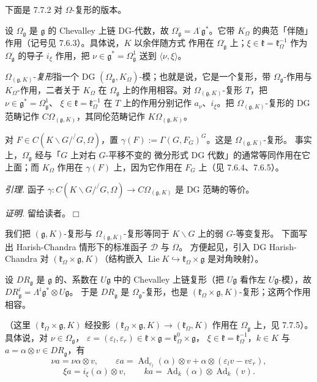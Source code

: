  下面是 7.7.2 对 $\Omega$-复形的版本。

设 $\Omega_{\mathfrak{g}}$ 是 $\mathfrak{g}$ 的 Chevalley 上链 DG-代数，故
$\Omega_{\mathfrak{g}}^{\cdot}=\Lambda^{\cdot}\mathfrak{g}^*$。它带
$K_\Omega$ 的典范「伴随」作用（记号见 7.6.3）。具体说，$K$ 以余伴随方式
作用在 $\Omega_{\mathfrak{g}}^{\cdot}$ 上；$\xi\in\mathfrak{k}
=\mathfrak{k}_\Omega^{-1}$ 作为 $\Omega_{\mathfrak{g}}^{\cdot}$ 的导子
$i_\xi$ 作用，把 $\nu\in\mathfrak{g}^*=\Omega_{\mathfrak{g}}^1$ 送到
$\langle\nu,\xi\rangle$。

$\Omega_{(\mathfrak{g},K)}$-\emph{复形}指一个 DG
$(\Omega_{\mathfrak{g}},K_\Omega)$-模；也就是说，它是一个复形，带
$\Omega_{\mathfrak{g}}$-作用与 $K_\Omega$-作用，二者关于 $K_\Omega$ 在
$\Omega_{\mathfrak{g}}$ 上的作用相容。对 $\Omega_{(\mathfrak{g},K)}$-复形
$T$，把 $\nu\in\mathfrak{g}^*=\Omega_{\mathfrak{g}}^1$、
$\xi\in\mathfrak{k}=\mathfrak{k}_\Omega^{-1}$ 在 $T$ 上的作用分别记作
$a_\nu$、$i_\xi$。把 $\Omega_{(\mathfrak{g},K)}$-复形的 DG 范畴记作
$C\Omega_{(\mathfrak{g},K)}$，其同伦范畴记作
$K\Omega_{(\mathfrak{g},K)}$。

对 $F\in C(K\backslash G/^{/}G,\Omega)$，置
$\gamma(F):=\Gamma(G,F_G)^G$。这是 $\Omega_{(\mathfrak{g},K)}$-复形。
事实上，$\Omega_{\mathfrak{g}}^{\cdot}$ 经与「$G$ 上对右 $G$-平移不变的
微分形式 DG 代数」的通常等同作用在它上面；而 $K_\Omega$ 作用在
$\gamma(F)$ 上，因为它作用在 $F_G$ 上（见 7.6.4、7.6.5）。

 \emph{引理.} 函子
$\gamma:C(K\backslash G/^{/}G,\Omega)\to C\Omega_{(\mathfrak{g},K)}$
是 DG 范畴的等价。

\emph{证明.} 留给读者。\hfill$\Box$

 我们把 $(\mathfrak{g},K)$-复形与
$\Omega_{(\mathfrak{g},K)}$-复形等同于 $K\backslash G$ 上的弱 $G$-等变复形。
下面写出 Harish-Chandra 情形下的标准函子 $\mathcal{D}$ 与 $\Omega$。
方便起见，引入 DG Harish-Chandra 对
$(\mathfrak{k}_\Omega\times\mathfrak{g},K)$（结构嵌入
$\operatorname{Lie}K\hookrightarrow\mathfrak{k}_\Omega\times\mathfrak{g}$
是对角映射）。

设 $DR_{\mathfrak{g}}$ 是 $\mathfrak{g}$ 的、系数在 $U\mathfrak{g}$ 中的
Chevalley 上链复形（把 $U\mathfrak{g}$ 看作左 $U\mathfrak{g}$-模），故
$DR_{\mathfrak{g}}^i=\Lambda^i\mathfrak{g}^*\otimes U\mathfrak{g}$。
于是 $DR_{\mathfrak{g}}$ 是 $\Omega_{\mathfrak{g}}$-复形，也是
$(\mathfrak{k}_\Omega\times\mathfrak{g},K)$-复形；这两个作用相容。


（这里 $(\mathfrak{k}_\Omega\times\mathfrak{g},K)$ 经投影
$(\mathfrak{k}_\Omega\times\mathfrak{g},K)\to(\mathfrak{k}_\Omega,K)$
作用在 $\Omega_{\mathfrak{g}}$ 上，见 7.7.5）。具体说，对
$\nu\in\Omega_{\mathfrak{g}}$，
$\varepsilon=(\varepsilon_l,\varepsilon_r)\in\mathfrak{k}\times\mathfrak{g}
=\mathfrak{k}_\Omega^0\times\mathfrak{g}$，
$\xi\in\mathfrak{k}=\mathfrak{k}_\Omega^{-1}$，$k\in K$ 与
$a=\alpha\otimes v\in DR_{\mathfrak{g}}$，有
\[
\nu a=\nu\alpha\otimes v,\qquad
\varepsilon a=\operatorname{Ad}_{\varepsilon_l}(\alpha)\otimes v
+\alpha\otimes(\varepsilon_l v-v\varepsilon_r),
\]
\[
\xi a=i_\xi(\alpha)\otimes v,\qquad
ka=\operatorname{Ad}_k(\alpha)\otimes\operatorname{Ad}_k(v).
\]

